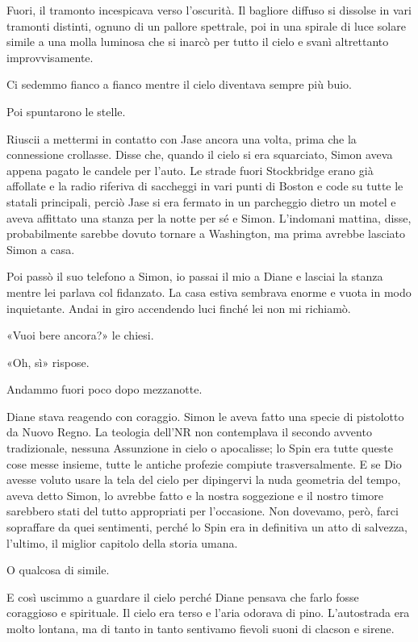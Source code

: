 Fuori, il tramonto incespicava verso l'oscurità. Il bagliore diffuso si
dissolse in vari tramonti distinti, ognuno di un pallore spettrale, poi
in una spirale di luce solare simile a una molla luminosa che si inarcò
per tutto il cielo e svanì altrettanto improvvisamente.

Ci sedemmo fianco a fianco mentre il cielo diventava sempre più buio.

Poi spuntarono le stelle.

\separatorefiori

Riuscii a mettermi in contatto con Jase ancora una volta, prima che la
connessione crollasse. Disse che, quando il cielo si era squarciato,
Simon aveva appena pagato le candele per l'auto. Le strade fuori
Stockbridge erano già affollate e la radio riferiva di saccheggi in vari
punti di Boston e code su tutte le statali principali, perciò Jase si
era fermato in un parcheggio dietro un motel e aveva affittato una
stanza per la notte per sé e Simon. L'indomani mattina, disse,
probabilmente sarebbe dovuto tornare a Washington, ma prima avrebbe
lasciato Simon a casa.

Poi passò il suo telefono a Simon, io passai il mio a Diane e lasciai la
stanza mentre lei parlava col fidanzato. La casa estiva sembrava enorme
e vuota in modo inquietante. Andai in giro accendendo luci finché lei
non mi richiamò.

«Vuoi bere ancora?» le chiesi.

«Oh, sì» rispose.

\separatorefiori

Andammo fuori poco dopo mezzanotte.

Diane stava reagendo con coraggio. Simon le aveva fatto una specie di
pistolotto da Nuovo Regno. La teologia dell'NR non contemplava il
secondo avvento tradizionale, nessuna Assunzione in cielo o apocalisse;
lo Spin era tutte queste cose messe insieme, tutte le antiche profezie
compiute trasversalmente. E se Dio avesse voluto usare la tela del cielo
per dipingervi la nuda geometria del tempo, aveva detto Simon, lo
avrebbe fatto e la nostra soggezione e il nostro timore sarebbero stati
del tutto appropriati per l'occasione. Non dovevamo, però, farci
sopraffare da quei sentimenti, perché lo Spin era in definitiva un atto
di salvezza, l'ultimo, il miglior capitolo della storia umana.

O qualcosa di simile.

E così uscimmo a guardare il cielo perché Diane pensava che farlo fosse
coraggioso e spirituale. Il cielo era terso e l'aria odorava di pino.
L'autostrada era molto lontana, ma di tanto in tanto sentivamo fievoli
suoni di clacson e sirene.

